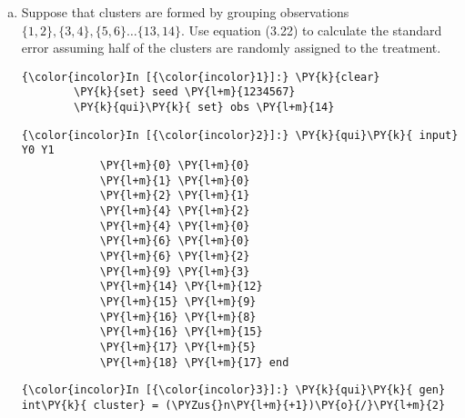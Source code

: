 \documentclass[11pt,notitlepage]{article}\usepackage[]{graphicx}\usepackage[]{color}
\makeatletter
\newenvironment{kframe}{%
 \def\at@end@of@kframe{}%
 \ifinner\ifhmode%
  \def\at@end@of@kframe{\end{minipage}}%
  \begin{minipage}{\columnwidth}%
 \fi\fi%
 \def\FrameCommand##1{\hskip\@totalleftmargin \hskip-\fboxsep
 \colorbox{shadecolor}{##1}\hskip-\fboxsep
     \hskip-\linewidth \hskip-\@totalleftmargin \hskip\columnwidth}%
 \MakeFramed {\advance\hsize-\width
   \@totalleftmargin\z@ \linewidth\hsize
   \@setminipage}}%
 {\par\unskip\endMakeFramed%
 \at@end@of@kframe}
\newenvironment{knitrout}{}{} %
\makeatother
\begin{document}
\begin{enumerate}[a)]
\item Suppose that clusters are formed by grouping observations $\{1,2\},\{3,4\},\{5,6\}\ldots\{13,14\}$.  Use equation (3.22) to calculate the standard error assuming half of the clusters are randomly assigned to the treatment.

\begin{knitrout}
\color{fgcolor}\begin{kframe}
    \begin{Verbatim}[commandchars=\\\{\}]
{\color{incolor}In [{\color{incolor}1}]:} \PY{k}{clear}
        \PY{k}{set} seed \PY{l+m}{1234567}
        \PY{k}{qui}\PY{k}{ set} obs \PY{l+m}{14}
\end{Verbatim}

    \begin{Verbatim}[commandchars=\\\{\}]
{\color{incolor}In [{\color{incolor}2}]:} \PY{k}{qui}\PY{k}{ input} Y0 Y1
        	\PY{l+m}{0} \PY{l+m}{0}
        	\PY{l+m}{1} \PY{l+m}{0}
        	\PY{l+m}{2} \PY{l+m}{1}
        	\PY{l+m}{4} \PY{l+m}{2}
        	\PY{l+m}{4} \PY{l+m}{0}
        	\PY{l+m}{6} \PY{l+m}{0}
        	\PY{l+m}{6} \PY{l+m}{2}
        	\PY{l+m}{9} \PY{l+m}{3}
        	\PY{l+m}{14} \PY{l+m}{12}
        	\PY{l+m}{15} \PY{l+m}{9}
        	\PY{l+m}{16} \PY{l+m}{8}
        	\PY{l+m}{16} \PY{l+m}{15}
        	\PY{l+m}{17} \PY{l+m}{5} 
        	\PY{l+m}{18} \PY{l+m}{17} end
\end{Verbatim}

    \begin{Verbatim}[commandchars=\\\{\}]
{\color{incolor}In [{\color{incolor}3}]:} \PY{k}{qui}\PY{k}{ gen} int\PY{k}{ cluster} = (\PYZus{}n\PY{l+m}{+1})\PY{o}{/}\PY{l+m}{2}
\end{Verbatim}


\end{kframe}
\end{knitrout}
\end{enumerate}
\end{document}
